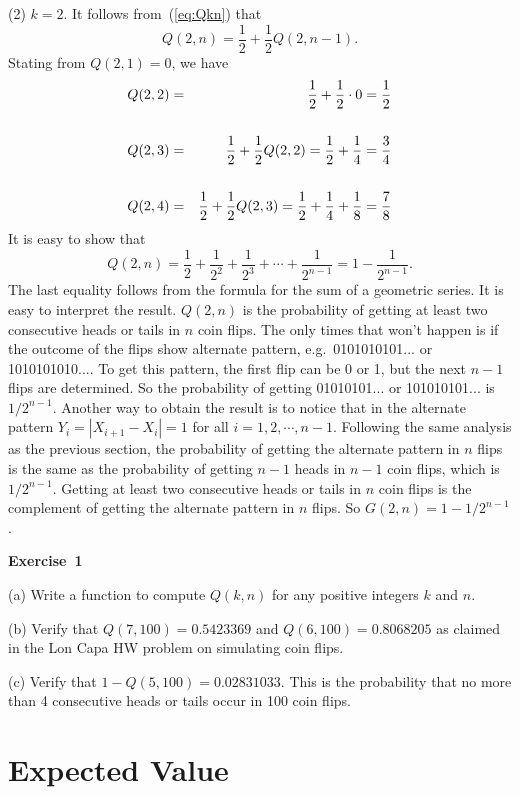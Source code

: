 \documentclass[11pt]{article}
\newcommand{\beq}{\begin{equation}}
\newcommand{\eeq}{\end{equation}}
\newcommand{\beqn}{\begin{eqnarray}}
\newcommand{\eeqn}{\end{eqnarray}}
\begin{document}
(2) $k=2$. It follows from~(\ref{eq:Qkn}) that 
\beq
  Q(2,n)=\frac{1}{2}+\frac{1}{2}Q(2,n-1) .
\eeq
Stating from $Q(2,1)=0$, we have 
\beqn
  Q(2,2)&=&\frac{1}{2} + \frac{1}{2}\cdot 0 = \frac{1}{2} \\ \cr
  Q(2,3) &=& \frac{1}{2} + \frac{1}{2}Q(2,2) = \frac{1}{2}+\frac{1}{4} = \frac{3}{4} \\ \cr 
  Q(2,4) &=& \frac{1}{2} + \frac{1}{2}Q(2,3) = \frac{1}{2} + \frac{1}{4} + \frac{1}{8} = 
\frac{7}{8} 
\eeqn
It is easy to show that 
\beq
  Q(2,n)=\frac{1}{2}+\frac{1}{2^2}+\frac{1}{2^3}+ \cdots + \frac{1}{2^{n-1}}=
1-\frac{1}{2^{n-1}} .
\eeq
The last equality follows from the formula for the sum of a geometric series. 
It is easy to interpret the result. $Q(2,n)$ is the probability of getting at least 
two consecutive heads or tails in $n$ coin flips. The only times that won't happen 
is if the outcome of the flips show alternate pattern, e.g.\ 0101010101... or 1010101010....
To get this pattern, the first flip can be 0 or 1, but the next $n-1$ flips are determined. 
So the probability of getting 01010101... or 101010101... is $1/2^{n-1}$. Another way to 
obtain the result is to notice that in the alternate pattern $Y_i=|X_{i+1}-X_i|=1$ for all 
$i=1,2,\cdots,n-1$. Following the same analysis as the previous section, the probability 
of getting the alternate pattern in $n$ flips is the 
same as the probability of getting $n-1$ heads in $n-1$ coin flips, which is $1/2^{n-1}$. 
Getting at least two consecutive heads or tails in $n$ coin flips is the complement of 
getting the alternate pattern in $n$ flips. So $G(2,n)=1-1/2^{n-1}$.

\vskip 1cm
{\bf Exercise~1} 

(a) Write a function to compute $Q(k,n)$ for any positive integers $k$ and $n$. 

(b) Verify that $Q(7,100)=0.5423369$ and $Q(6,100)=0.8068205$ as claimed in the 
Lon Capa HW problem on simulating coin flips.

(c) Verify that $1-Q(5,100)=0.02831033$. This is the probability that no more than 
4 consecutive heads or tails occur in 100 coin flips. 

\section{Expected Value} 
\end{document}
